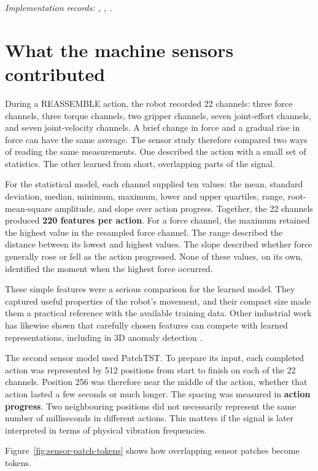 \textit{Implementation records: , , .}

\section{What the machine sensors contributed}

During a REASSEMBLE action, the robot recorded 22 channels: three force channels, three
torque channels, two gripper channels, seven joint-effort channels, and seven
joint-velocity channels. A brief change in force and a gradual rise in force can have
the same average. The sensor study therefore compared two ways of reading the same
measurements. One described the action with a small set of statistics. The other learned
from short, overlapping parts of the signal.

For the statistical model, each channel supplied ten values: the mean, standard
deviation, median, minimum, maximum, lower and upper quartiles, range, root-mean-square
amplitude, and slope over action progress. Together, the 22 channels produced
\textbf{220 features per action}. For a force channel, the maximum retained the highest
value in the resampled force channel. The range described the distance between its
lowest and highest values. The slope described whether force generally rose or fell as
the action progressed. None of these values, on its own, identified the moment when the
highest force occurred.

These simple features were a serious comparison for the learned model. They captured
useful properties of the robot’s movement, and their compact size made them a practical
reference with the available training data. Other industrial work has likewise shown
that carefully chosen features can compete with learned representations, including in 3D
anomaly detection \parencite{Horwitz2023Back}.

The second sensor model used PatchTST. To prepare its input, each completed action was
represented by 512 positions from start to finish on each of the 22 channels. Position
256 was therefore near the middle of the action, whether that action lasted a few
seconds or much longer. The spacing was measured in \textbf{action progress}. Two
neighbouring positions did not necessarily represent the same number of milliseconds in
different actions. This matters if the signal is later interpreted in terms of physical
vibration frequencies.

Figure~\ref{fig:sensor-patch-tokens} shows how overlapping sensor patches become tokens.

